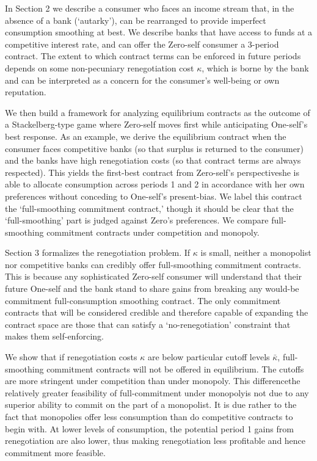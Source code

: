 \documentclass[11pt,english]{article}
\theoremstyle{plain}
\theoremstyle{definition}
\begin{document}
In Section 2 we describe a consumer who faces an income stream that,
in the absence of a bank (`autarky'), can be rearranged to provide
imperfect consumption smoothing at best. We describe banks that have
access to funds at a competitive interest rate, and can offer the
Zero-self consumer a 3-period contract. The extent to which contract
terms can be enforced in future periods depends on some non-pecuniary
renegotiation cost $\kappa$, which is borne by the bank and can be
interpreted as a concern for the consumer's well-being or own reputation.

We then build a framework for analyzing equilibrium contracts as the
outcome of a Stackelberg-type game where Zero-self moves first while
anticipating One-self's best response. As an example, we derive the
equilibrium contract when the consumer faces competitive banks (so
that surplus is returned to the consumer) and the banks have high
renegotiation costs (so that contract terms are always respected).
This yields the first-best contract from Zero-self's perspective\textendash she
is able to allocate consumption across periods 1 and 2 in accordance
with her own preferences without conceding to One-self's present-bias.
We label this contract the `full-smoothing commitment contract,' though
it should be clear that the `full-smoothing' part is judged against
Zero's preferences. We compare full-smoothing commitment contracts
under competition and monopoly.

Section 3 formalizes the renegotiation problem. If $\kappa$ is small,
neither a monopolist nor competitive banks can credibly offer full-smoothing
commitment contracts. This is because any sophisticated Zero-self
consumer will understand that their future One-self and the bank stand
to share gains from breaking any would-be commitment full-consumption
smoothing contract. The only commitment contracts that will be considered
credible and therefore capable of expanding the contract space are
those that can satisfy a `no-renegotiation' constraint that makes
them self-enforcing. 

We show that if renegotiation costs $\kappa$ are below particular
cutoff levels $\bar{\kappa}$, full-smoothing commitment contracts
will not be offered in equilibrium. The cutoffs are more stringent
under competition than under monopoly. This difference\textendash the
relatively greater feasibility of full-commitment under monopoly\textendash is
not due to any superior ability to commit on the part of a monopolist.
It is due rather to the fact that monopolies offer less consumption
than do competitive contracts to begin with. At lower levels of consumption,
the potential period 1 gains from renegotiation are also lower, thus
making renegotiation less profitable and hence commitment more feasible.
\end{document}
